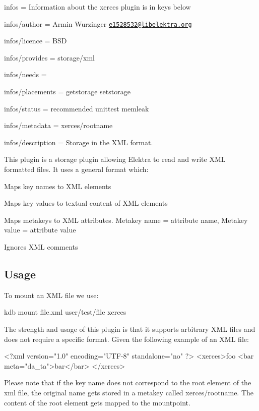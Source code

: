 
\begin{DoxyItemize}
\item infos = Information about the xerces plugin is in keys below
\item infos/author = Armin Wurzinger \href{mailto:e1528532@libelektra.org}{\tt e1528532@libelektra.\+org}
\item infos/licence = B\+SD
\item infos/provides = storage/xml
\item infos/needs =
\item infos/placements = getstorage setstorage
\item infos/status = recommended unittest memleak
\item infos/metadata = xerces/rootname
\item infos/description = Storage in the X\+ML format.
\end{DoxyItemize}

This plugin is a storage plugin allowing Elektra to read and write X\+ML formatted files. It uses a general format which\+:


\begin{DoxyItemize}
\item Maps key names to X\+ML elements
\item Maps key values to textual content of X\+ML elements
\item Maps metakeys to X\+ML attributes. Metakey name = attribute name, Metakey value = attribute value
\item Ignores X\+ML comments
\end{DoxyItemize}

\subsection*{Usage}

To mount an X\+ML file we use\+: \begin{DoxyVerb}    kdb mount file.xml user/test/file xerces
\end{DoxyVerb}


The strength and usage of this plugin is that it supports arbitrary X\+ML files and does not require a specific format. Given the following example of an X\+ML file\+: \begin{DoxyVerb}    <?xml version="1.0" encoding="UTF-8" standalone="no" ?>
    <xerces>foo
      <bar meta="da_ta">bar</bar>
    </xerces>
\end{DoxyVerb}


Please note that if the key name does not correspond to the root element of the xml file, the original name gets stored in a metakey called {\ttfamily xerces/rootname}. The content of the root element gets mapped to the mountpoint.

